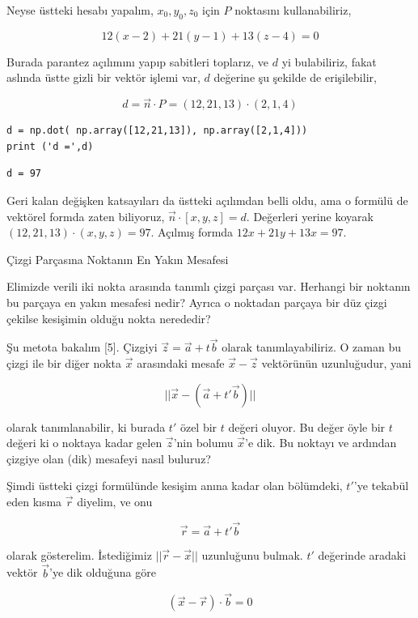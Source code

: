 \documentclass[12pt,fleqn]{article}\usepackage{../../common}
\begin{document}
Neyse üstteki hesabı yapalım, $x_0,y_0,z_0$ için $P$ noktasını kullanabiliriz,

$$
12(x-2) + 21(y-1) + 13(z-4) = 0
$$

Burada parantez açılımını yapıp sabitleri toplarız, ve $d$ yi bulabiliriz, fakat
aslında üstte gizli bir vektör işlemi var, $d$ değerine şu şekilde de erişilebilir,

$$
d = \vec{n} \cdot P = (12,21,13) \cdot (2,1,4)
$$

\begin{verbatim}
d = np.dot( np.array([12,21,13]), np.array([2,1,4]))
print ('d =',d)
\end{verbatim}

\begin{verbatim}
d = 97
\end{verbatim}

Geri kalan değişken katsayıları da üstteki açılımdan belli oldu, ama o formülü
de vektörel formda zaten biliyoruz, $\vec{n} \cdot [x,y,z] = d$. Değerleri
yerine koyarak $(12,21,13) \cdot (x,y,z) = 97 $. Açılmış formda
$12x + 21y + 13x = 97$.

Çizgi Parçasına Noktanın En Yakın Mesafesi

Elimizde verili iki nokta arasında tanımlı çizgi parçası var. Herhangi bir
noktanın bu parçaya en yakın mesafesi nedir? Ayrıca o noktadan parçaya bir düz
çizgi çekilse kesişimin olduğu nokta nerededir?

Şu metota bakalım [5]. Çizgiyi $\vec{z} = \vec{a} + t \vec{b}$ olarak
tanımlayabiliriz. O zaman bu çizgi ile bir diğer nokta $\vec{x}$ arasındaki
mesafe $\vec{x}-\vec{z}$ vektörünün uzunluğudur, yani

$$
|| \vec{x} - (\vec{a} + t' \vec{b}) ||
$$

olarak tanımlanabilir, ki burada $t'$ özel bir $t$ değeri oluyor. Bu değer öyle
bir $t$ değeri ki o noktaya kadar gelen $\vec{z}$'nin bolumu $\vec{x}$'e dik. Bu
noktayı ve ardından çizgiye olan (dik) mesafeyi nasıl buluruz?

Şimdi üstteki çizgi formülünde kesişim anına kadar olan bölümdeki, $t'$'ye
tekabül eden kısma $\vec{r}$ diyelim, ve onu

$$
\vec{r} = \vec{a} + t' \vec{b}
$$

olarak gösterelim. İstediğimiz $||\vec{r}-\vec{x}||$ uzunluğunu bulmak. $t'$
değerinde aradaki vektör $\vec{b}$'ye dik olduğuna göre

$$
(\vec{x} - \vec{r}) \cdot \vec{b} = 0
$$
\end{document}
